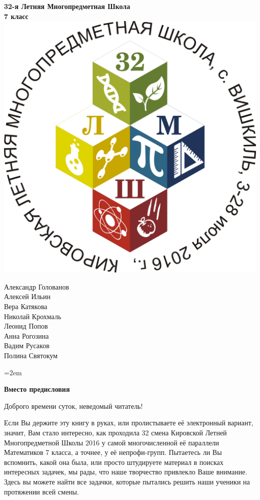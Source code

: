 \documentclass[12pt]{book}
\begin{document}
\begin{center}
	\Huge{\bf 32-я Летняя Многопредметная Школа}\\
	\Large{\bf 7 класс}\\ \vspace{.3cm}
	\includegraphics[width=\textwidth]{logo}
	\begin{multicols}{2}
		Александр Голованов \\
		Алексей Ильин \\
		Вера Катякова \\
		Николай Крохмаль \\
		Леонид Попов \\
		Анна Рогозина \\
		Вадим Русаков \\
		Полина Святокум \\
	\end{multicols}
\end{center}

\newpage

\parindent=2em

\Large{\bf Вместо предисловия}
\normalsize

Доброго времени суток, неведомый читатель!

Если Вы держите эту книгу в руках, или пролистываете её электронный вариант, значит, Вам стало интересно, как проходила 32 смена Кировской Летней Многопредметной Школы 2016 у самой многочисленной её параллели Математиков 7 класса, а точнее, у её непрофи-групп. Пытаетесь ли  Вы вспомнить, какой она была, или просто штудируете материал в поисках интересных задачек, мы рады, что наше творчество привлекло Ваше внимание. Здесь вы можете найти все задачки, которые пытались решить наши ученики на протяжении всей смены.
\end{document}
